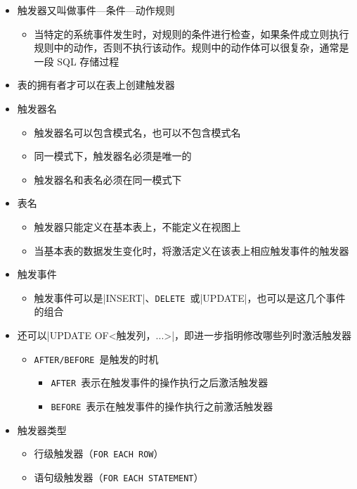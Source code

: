 \begin{itemize}
    \item 触发器又叫做事件—条件—动作规则
    \begin{itemize}
        \item 当特定的系统事件发生时，对规则的条件进行检查，如果条件成立则执行规则中的动作，否则不执行该动作。规则中的动作体可以很复杂，通常是一段 SQL 存储过程
    \end{itemize}
    \item 表的拥有者才可以在表上创建触发器
    \item 触发器名
    \begin{itemize}
        \item 触发器名可以包含模式名，也可以不包含模式名
        \item 同一模式下，触发器名必须是唯一的
        \item 触发器名和表名必须在同一模式下
    \end{itemize}
    \item 表名
    \begin{itemize}
        \item 触发器只能定义在基本表上，不能定义在视图上
        \item 当基本表的数据发生变化时，将激活定义在该表上相应触发事件的触发器
    \end{itemize}
    \item 触发事件
    \begin{itemize}
        \item 触发事件可以是\sverb|INSERT|、\verb|DELETE|\ 或\sverb|UPDATE|，也可以是这几个事件的组合
    \end{itemize}
    \item 还可以\sverb|UPDATE OF<触发列，...>|，即进一步指明修改哪些列时激活触发器
    \begin{itemize}
        \item \verb|AFTER/BEFORE|\ 是触发的时机
        \begin{itemize}
            \item \verb|AFTER|\ 表示在触发事件的操作执行之后激活触发器
            \item \verb|BEFORE|\ 表示在触发事件的操作执行之前激活触发器
        \end{itemize}
    \end{itemize}
    \item 触发器类型
    \begin{itemize}
        \item 行级触发器（\verb|FOR EACH ROW|）
        \item 语句级触发器（\verb|FOR EACH STATEMENT|） 

\end{itemize}
\end{itemize}

